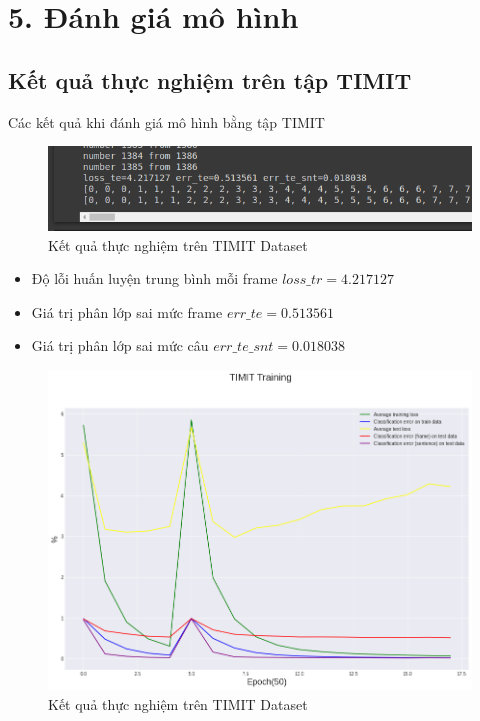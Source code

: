 \documentclass{article}
\begin{document}
	\section{5. Đánh giá mô hình}
	\subsection{Kết quả thực nghiệm trên tập TIMIT}
	Các kết quả khi đánh giá mô hình bằng tập TIMIT
	\begin{figure}[H]
		\centering
		\includegraphics[width=.75\textwidth]{result/evaluate_result_timit.png}
		\caption{Kết quả thực nghiệm trên TIMIT Dataset}
		\label{fig:writing-thesis}
	\end{figure}
	\begin{itemize}
		\item Độ lỗi huấn luyện trung bình mỗi frame $loss\_tr=4.217127$
		\item Giá trị phân lớp sai mức frame $err\_te=0.513561$
		\item Giá trị phân lớp sai mức câu $err\_te\_snt =0.018038$
	\end{itemize}
	\begin{figure}[H]
		\centering
		\includegraphics[width=.75\textwidth]{result/sincnet_timit_plot.png}
		\caption{Kết quả thực nghiệm trên TIMIT Dataset}
		\label{fig:writing-thesis}
	\end{figure}
\end{document}
